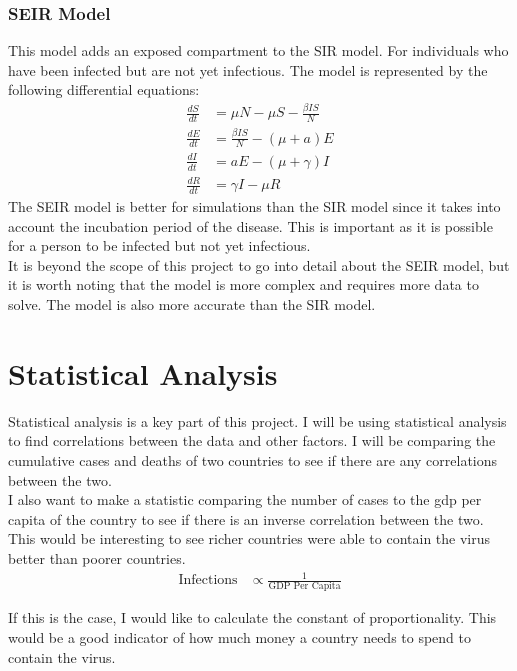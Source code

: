 \documentclass{report}
\begin{document}
\subsubsection{SEIR Model}
This model adds an exposed compartment to the SIR model. For individuals who have been infected but are not yet infectious. The model is represented by the following differential equations:
\begin{align}
\frac{dS}{dt} &= \mu N - \mu S - \frac{\beta IS}{N} \label{seir_model_dS} \\
\frac{dE}{dt} &= \frac{\beta IS}{N} - (\mu + a)E \label{seir_model_dE} \\
\frac{dI}{dt} &= aE - (\mu + \gamma)I \label{seir_model_dI} \\
\frac{dR}{dt} &= \gamma I - \mu R \label{seir_model_dR}
\end{align}
The SEIR model is better for simulations than the SIR model since it takes into account the incubation period of the disease. This is important as it is possible for a person to be infected but not yet infectious.\\
It is beyond the scope of this project to go into detail about the SEIR model, but it is worth noting that the model is more complex and requires more data to solve. The model is also more accurate than the SIR model.
\newpage
\section{Statistical Analysis}
Statistical analysis is a key part of this project. I will be using statistical analysis to find correlations between the data and other factors. I will be comparing the cumulative cases and deaths of two countries to see if there are any correlations between the two.\\

I also want to make a statistic comparing the number of cases to the gdp per capita of the country to see if there is an inverse correlation between the two. This would be interesting to see richer countries were able to contain the virus better than poorer countries.
\begin{align}
\text{Infections} &\propto \frac{1}{\text{GDP Per Capita}}
\end{align}

If this is the case, I would like to calculate the constant of proportionality. This would be a good indicator of how much money a country needs to spend to contain the virus. \\
\end{document}
